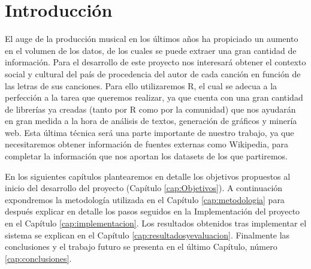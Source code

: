 \chapter{Introducción}
\label{cap:introduccion}

El auge de la producción musical en los últimos años ha propiciado un aumento en el volumen de los datos, de los cuales se puede extraer una gran cantidad de información. Para el desarrollo de este proyecto nos interesará obtener el contexto social y cultural del país de procedencia del autor de cada canción en función de las letras de sus canciones. Para ello utilizaremos R, el cual se adecua a la perfección a la tarea que queremos realizar, ya que cuenta con una gran cantidad de librerías ya creadas (tanto por R como por la comunidad) que nos ayudarán en gran medida a la hora de análisis de textos, generación de gráficos y minería web. Esta última técnica será una parte importante de nuestro trabajo, ya que necesitaremos obtener información de fuentes externas como Wikipedia, para completar la información que nos aportan los datasets de los que partiremos.


En los siguientes capítulos plantearemos en detalle los objetivos propuestos al inicio del desarrollo del proyecto (Capítulo \ref{cap:Objetivos}). A continuación expondremos la metodología utilizada en el Capítulo \ref{cap:metodologia} para después explicar en detalle los pasos seguidos en la Implementación del proyecto en el Capítulo \ref{cap:implementacion}. Los resultados obtenidos tras implementar el sistema se explican en el Capítulo \ref{cap:resultadosyevaluacion}. Finalmente las conclusiones y el trabajo futuro se presenta en el último Capítulo, número \ref{cap:conclusiones}.